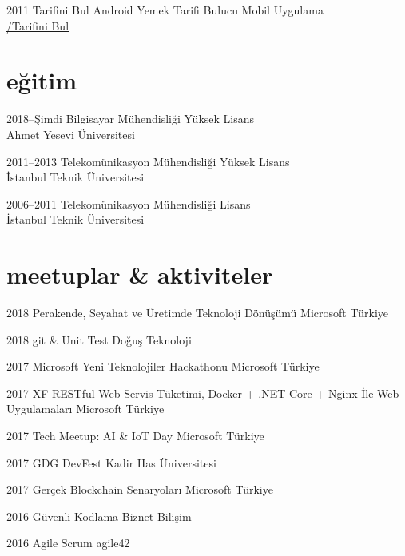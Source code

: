 \documentclass[]{../friggeri-cv} %
\begin{document}
\begin{entrylist}

\entry
{2011}
{Tarifini Bul}
{Android}
{Yemek Tarifi Bulucu Mobil Uygulama
\\\href{https://play.google.com/store/apps/details?id=com.tarifinibul}{\faAndroid/Tarifini Bul}}

\end{entrylist}

\section{eğitim}

\begin{entrylist}

\entry
{2018--Şimdi}
{Bilgisayar Mühendisliği}{}
{Yüksek Lisans
\\Ahmet Yesevi Üniversitesi}

\entry
{2011--2013}
{Telekomünikasyon Mühendisliği}{}
{Yüksek Lisans
\\İstanbul Teknik Üniversitesi}

\entry
{2006--2011}
{Telekomünikasyon Mühendisliği}{}
{Lisans
\\İstanbul Teknik Üniversitesi}
	
\end{entrylist}

\section{meetuplar \& aktiviteler}

\begin{entrylist}

\entry
{2018}
{Perakende, Seyahat ve Üretimde Teknoloji Dönüşümü}{}
{Microsoft Türkiye}

\entry
{2018}
{git \& Unit Test}{}
{Doğuş Teknoloji}

\entry
{2017}
{Microsoft Yeni Teknolojiler Hackathonu}{}
{Microsoft Türkiye}

\entry
{2017}
{XF RESTful Web Servis Tüketimi, Docker + .NET Core + Nginx İle Web Uygulamaları}{}
{Microsoft Türkiye}

\entry
{2017}
{Tech Meetup: AI \& IoT Day}{}
{Microsoft Türkiye}

\entry
{2017}
{GDG DevFest}{}
{Kadir Has Üniversitesi}

\entry
{2017}
{Gerçek Blockchain Senaryoları}{}
{Microsoft Türkiye}

\entry
{2016}
{Güvenli Kodlama}{}
{Biznet Bilişim}

\entry
{2016}
{Agile Scrum}{}
{agile42}

\end{entrylist}
\end{document}
